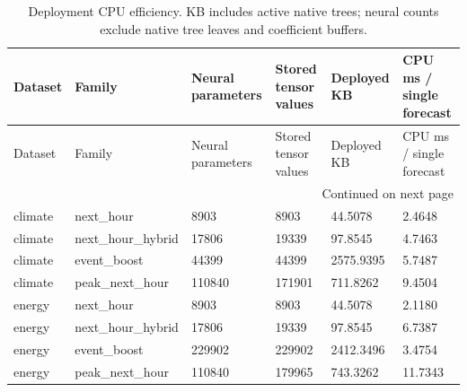 {\footnotesize
\setlength{\tabcolsep}{3pt}
\renewcommand{\arraystretch}{1.17}
\begin{longtable}{@{}p{}p{}p{}p{}p{}p{}@{}}
\caption{Deployment CPU efficiency. KB includes active native trees; neural counts exclude native tree leaves and coefficient buffers.}\label{tab:efficiency}\\
\toprule
Dataset & Family & Neural parameters & Stored tensor values & Deployed KB & CPU ms / single forecast \\
\midrule\endfirsthead
Dataset & Family & Neural parameters & Stored tensor values & Deployed KB & CPU ms / single forecast \\
\midrule\endhead
\midrule\multicolumn{6}{r}{Continued on next page}\\\endfoot
\bottomrule\endlastfoot
climate & next\_\allowbreak{}hour & 8903 & 8903 & 44.5078 & 2.4648 \\
climate & next\_\allowbreak{}hour\_\allowbreak{}hybrid & 17806 & 19339 & 97.8545 & 4.7463 \\
climate & event\_\allowbreak{}boost & 44399 & 44399 & 2575.9395 & 5.7487 \\
climate & peak\_\allowbreak{}next\_\allowbreak{}hour & 110840 & 171901 & 711.8262 & 9.4504 \\
energy & next\_\allowbreak{}hour & 8903 & 8903 & 44.5078 & 2.1180 \\
energy & next\_\allowbreak{}hour\_\allowbreak{}hybrid & 17806 & 19339 & 97.8545 & 6.7387 \\
energy & event\_\allowbreak{}boost & 229902 & 229902 & 2412.3496 & 3.4754 \\
energy & peak\_\allowbreak{}next\_\allowbreak{}hour & 110840 & 179965 & 743.3262 & 11.7343 \\
\end{longtable}
}
